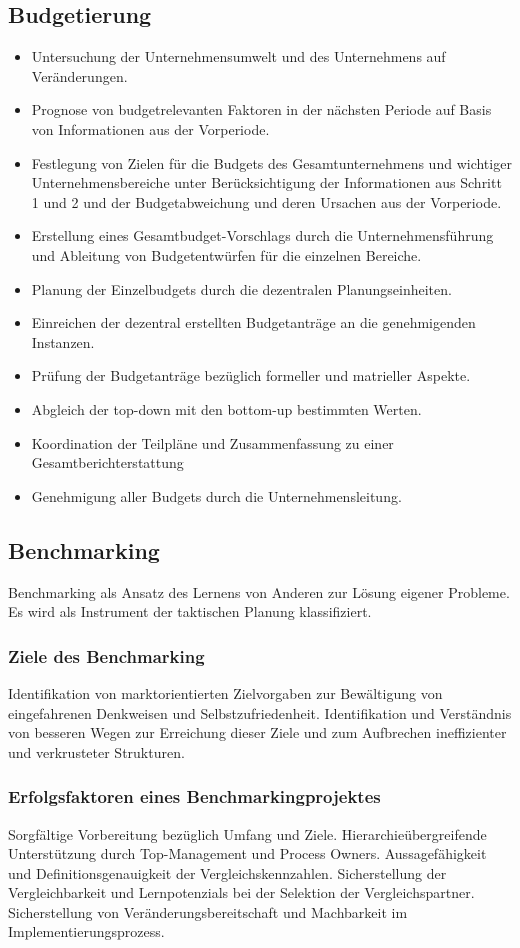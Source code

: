 \documentclass{article}
\begin{document}
\subsection{Budgetierung}
\begin{itemize}
\item Untersuchung der Unternehmensumwelt und des Unternehmens auf
Veränderungen.
\item Prognose von budgetrelevanten Faktoren in der nächsten Periode auf Basis
von Informationen aus der Vorperiode.
\item Festlegung von Zielen für die Budgets des Gesamtunternehmens und
wichtiger Unternehmensbereiche unter Berücksichtigung der Informationen
aus Schritt 1 und 2 und der Budgetabweichung und deren Ursachen aus der
Vorperiode.
\item Erstellung eines Gesamtbudget-Vorschlags durch die Unternehmensführung
und Ableitung von Budgetentwürfen für die einzelnen Bereiche.
\item Planung der Einzelbudgets durch die dezentralen Planungseinheiten.
\item Einreichen der dezentral erstellten Budgetanträge an die genehmigenden
Instanzen. 
\item Prüfung der Budgetanträge bezüglich formeller und matrieller Aspekte.
\item Abgleich der top-down mit den bottom-up bestimmten Werten.
\item Koordination der Teilpläne und Zusammenfassung zu einer Gesamtberichterstattung
\item Genehmigung aller Budgets durch die Unternehmensleitung.

\end{itemize}

\subsection{Benchmarking}
Benchmarking als Ansatz des Lernens von Anderen zur Lösung eigener
Probleme. Es wird als Instrument der taktischen Planung klassifiziert.
\subsubsection{Ziele des Benchmarking} 
Identifikation von marktorientierten Zielvorgaben zur Bewältigung von
eingefahrenen Denkweisen und Selbstzufriedenheit.
Identifikation und Verständnis von besseren Wegen zur Erreichung dieser
Ziele und zum Aufbrechen ineffizienter und verkrusteter Strukturen.
\subsubsection{Erfolgsfaktoren eines Benchmarkingprojektes}
Sorgfältige Vorbereitung bezüglich Umfang und Ziele.
Hierarchieübergreifende Unterstützung durch Top-Management und
Process Owners.
Aussagefähigkeit und Definitionsgenauigkeit der Vergleichskennzahlen.
Sicherstellung der Vergleichbarkeit und Lernpotenzials bei der Selektion
der Vergleichspartner.
Sicherstellung von Veränderungsbereitschaft und Machbarkeit im
Implementierungsprozess.
\end{document}
